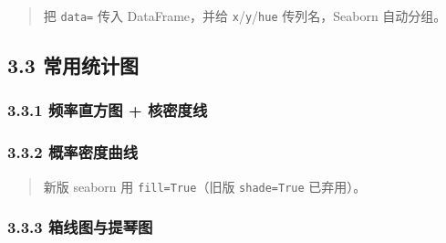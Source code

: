 \begin{quote}
把 \texttt{data=} 传入 DataFrame，并给
\texttt{x}/\texttt{y}/\texttt{hue} 传列名，Seaborn 自动分组。
\end{quote}

\subsection{3.3 常用统计图}\label{ux5e38ux7528ux7edfux8ba1ux56fe}

\subsubsection{3.3.1 频率直方图 +
核密度线}\label{ux9891ux7387ux76f4ux65b9ux56fe-ux6838ux5bc6ux5ea6ux7ebf}

\begin{Shaded}
\begin{Highlighting}[]

\OperatorTok{=}\NormalTok{)}
\OperatorTok{=}\OperatorTok{=}\NormalTok{)}
\end{Highlighting}
\end{Shaded}

\subsubsection{3.3.2
概率密度曲线}\label{ux6982ux7387ux5bc6ux5ea6ux66f2ux7ebf}

\begin{Shaded}
\begin{Highlighting}[]
\NormalTok{sns.kdeplot(tips[}\NormalTok{], fill}\OperatorTok{=}\NormalTok{)}
\end{Highlighting}
\end{Shaded}

\begin{quote}
新版 seaborn 用 \texttt{fill=True}（旧版 \texttt{shade=True} 已弃用）。
\end{quote}

\subsubsection{3.3.3
箱线图与提琴图}\label{ux7bb1ux7ebfux56feux4e0eux63d0ux7434ux56fe}

